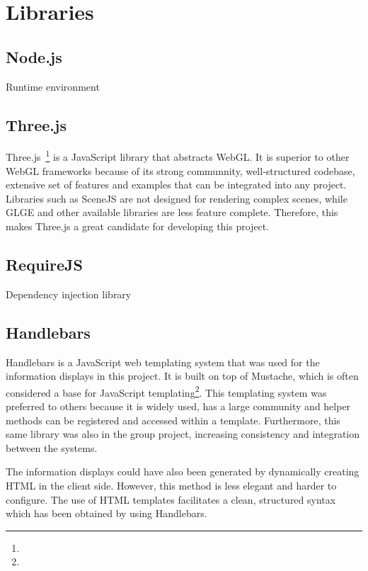 \section{Libraries} {
\label{sec:libraries}
	
	\subsection{Node.js} {
	\label{sec:nodejs}
	
		Runtime environment

	}

	\subsection{Three.js} {
	\label{sec:threejs}

		Three.js~\footnote{} is a JavaScript library that abstracts WebGL. It is superior to other WebGL frameworks because of its strong communnity, well-structured codebase, extensive set of features and examples that can be integrated into any project. Libraries such as SceneJS are not designed for rendering complex scenes, while GLGE and other available libraries are less feature complete. Therefore, this makes Three.js a great candidate for developing this project.

	}

	\subsection{RequireJS} {
	\label{sec:requirejs}
		
		Dependency injection library

	}

	\subsection{Handlebars} {
	\label{sec:handlebars}

		Handlebars is a JavaScript web templating system that was used for the information displays in this project. It is built on top of Mustache, which is often considered a base for JavaScript templating\footnote{}. This templating system was preferred to others because it is widely used, has a large community and helper methods can be registered and accessed within a template. Furthermore, this same library was also in the group project, increasing consistency and integration between the systems.

		The information displays could have also been generated by dynamically creating HTML in the client side. However, this method is less elegant and harder to configure. The use of HTML templates facilitates a clean, structured syntax which has been obtained by using Handlebars.

	}

}

